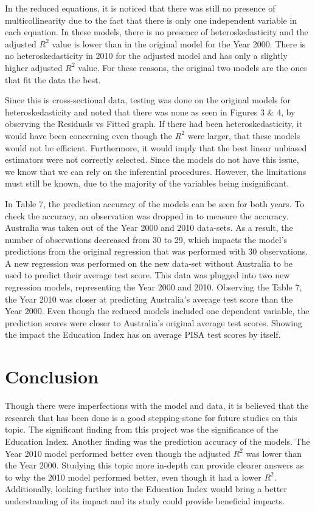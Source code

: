 \documentclass[12pt,english]{article}
\begin{document}
In the reduced equations, it is noticed that there was still no presence of multicollinearity due to the fact that there is only one independent variable in each equation. In these models, there is no presence of heteroskedasticity and the adjusted $R^2$ value is lower than in the original model for the Year 2000. There is no heteroskedasticity in 2010 for the adjusted model and has only a slightly higher adjusted $R^2$ value. For these reasons, the original two models are the ones that fit the data the best.

Since this is cross-sectional data, testing was done on the original models for heteroskedasticity and noted that there was none as seen in Figures 3 \& 4, by observing the Residuals vs Fitted graph. If there had been heteroskedasticity, it would have been concerning even though the $R^2$ were larger, that these models would not be efficient. Furthermore, it would imply that the best linear unbiased estimators were not correctly selected. Since the models do not have this issue, we know that we can rely on the inferential procedures. However, the limitations must still be known, due to the majority of the variables being insignificant. 

In Table 7, the prediction accuracy of the models can be seen for both years. To check the accuracy, an observation was dropped in to measure the accuracy. Australia was taken out of the Year 2000 and 2010 data-sets. As a result, the number of observations decreased from 30 to 29, which impacts the model's predictions from the original regression that was performed with 30 observations. A new regression was performed on the new data-set without Australia to be used to predict their average test score. This data was plugged into two new regression models, representing the Year 2000 and 2010. Observing the Table 7, the Year 2010 was closer at predicting Australia's average test score than the Year 2000. Even though the reduced models included one dependent variable, the prediction scores were closer to Australia's original average test scores. Showing the impact the Education Index has on average PISA test scores by itself. 


\section{Conclusion}
Though there were imperfections with the model and data, it is believed that the research that has been done is a good stepping-stone for future studies on this topic. The significant finding from this project was the significance of the Education Index. Another finding was the prediction accuracy of the models. The Year 2010 model performed better even though the adjusted $R^2$ was lower than the Year 2000. Studying this topic more in-depth can provide clearer answers as to why the 2010 model performed better, even though it had a lower $R^2$. Additionally, looking further into the Education Index would bring a better understanding of its impact and its study could provide beneficial impacts. 
\end{document}
